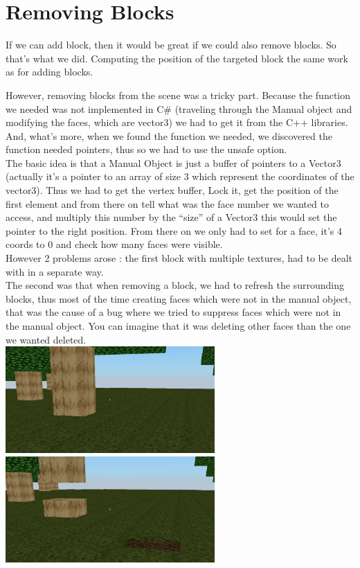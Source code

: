 \documentclass[article]{report}             %
\begin{document}
				
				
			\section{Removing Blocks}
				If we can add block, then it would be great if we could also remove blocks. So that's what we did. Computing the position of the targeted block the same work as for adding blocks.

				However, removing blocks from the scene was a tricky part. Because the function we needed was not implemented in C\# (traveling through the Manual object and modifying the faces, which are vector3) we had to get it from the C++ libraries. And, what's more, when we found the function we needed, we discovered the function needed pointers, thus so we had to use the unsafe option.\\

				The basic idea is that a Manual Object is just a buffer of pointers to a Vector3 (actually it's a pointer to an array of size 3 which represent the coordinates of the vector3). Thus we had to get the vertex buffer, Lock it, get the position of the first element and from there on tell what was the face number we wanted to access, and multiply this number by the \enquote{size} of a Vector3 this would set the pointer to the right position. From there on we only had to set for a face, it's 4 coords to 0 and check how many faces were visible.\\

				However 2 problems arose : the first block with multiple textures, had to be dealt with in a separate way. \\
				The second was that when removing a block, we had to refresh the surrounding blocks, thus most of the time creating faces which were not in the manual object, that was the cause of a bug where we tried to suppress faces which were not in the manual object. You can imagine that it was deleting other faces than the one we wanted deleted.\\

				\includegraphics[width = 8cm]{images/Graphics/before.png}		
				\includegraphics[width = 8cm]{images/Graphics/after.png} \\
\end{document}
